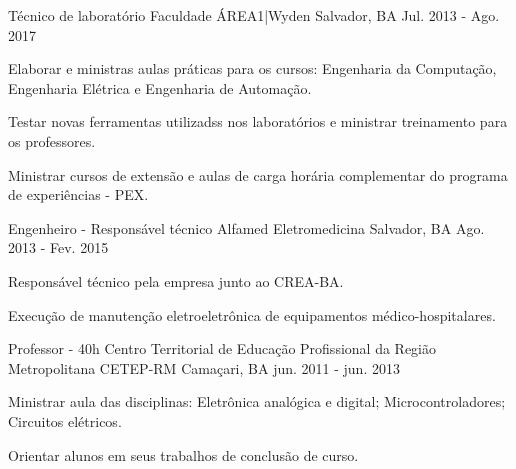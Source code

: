 \begin{cventries}
  \cventry
    {Técnico de laboratório} %
    {Faculdade ÁREA1|Wyden} %
    {Salvador, BA} %
    {Jul. 2013 - Ago. 2017} %
    {
      \begin{cvitems} %
        \item {Elaborar e ministras aulas práticas para os cursos: Engenharia da Computação, Engenharia Elétrica e Engenharia de Automação.}
        \item {Testar novas ferramentas utilizadss nos laboratórios e ministrar treinamento para os professores.}
        \item {Ministrar cursos de extensão e aulas de carga horária complementar do programa de experiências - PEX.}
      \end{cvitems}
    }

  \cventry
    {Engenheiro - Responsável técnico} %
    {Alfamed Eletromedicina} %
    {Salvador, BA} %
    {Ago. 2013 - Fev. 2015} %
    {
      \begin{cvitems} %
        \item {Responsável técnico pela empresa junto ao CREA-BA.}
        \item {Execução de manutenção eletroeletrônica de equipamentos médico-hospitalares.}
      \end{cvitems}
    }
    

  \cventry
    {Professor - 40h} %
    {Centro Territorial de Educação Profissional da Região Metropolitana CETEP-RM} %
    {Camaçari, BA} %
    {jun. 2011 - jun. 2013} %
    {
      \begin{cvitems} %
        \item {Ministrar aula das disciplinas: Eletrônica analógica e digital; Microcontroladores; Circuitos elétricos.}
        \item {Orientar alunos em seus trabalhos de conclusão de curso.}
      \end{cvitems}
    }
    

\end{cventries}
